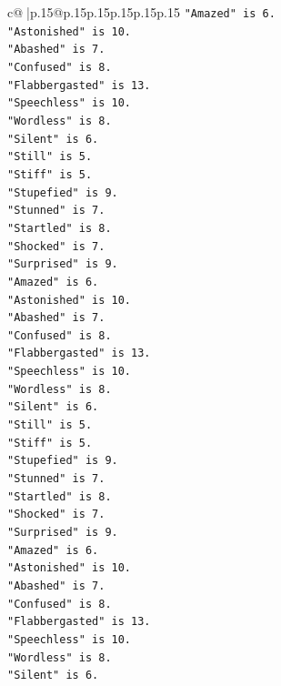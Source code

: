 \documentclass{article}
\begin{document}
{\begin{supertabular}{c@{$\;$}|p{.15\linewidth}@{}p{.15\linewidth}p{.15\linewidth}p{.15\linewidth}p{.15\linewidth}p{.15\linewidth}}
{{{\texttt{"Amazed" is 6.} \\
\texttt{"Astonished" is 10.} \\
\texttt{"Abashed" is 7.} \\
\texttt{"Confused" is 8.} \\
\texttt{"Flabbergasted" is 13.} \\
\texttt{"Speechless" is 10.} \\
\texttt{"Wordless" is 8.} \\
\texttt{"Silent" is 6.} \\
\texttt{"Still" is 5.} \\
\texttt{"Stiff" is 5.} \\
\texttt{"Stupefied" is 9.} \\
\texttt{"Stunned" is 7.} \\
\texttt{"Startled" is 8.} \\
\texttt{"Shocked" is 7.} \\
\texttt{"Surprised" is 9.} \\
\texttt{"Amazed" is 6.} \\
\texttt{"Astonished" is 10.} \\
\texttt{"Abashed" is 7.} \\
\texttt{"Confused" is 8.} \\
\texttt{"Flabbergasted" is 13.} \\
\texttt{"Speechless" is 10.} \\
\texttt{"Wordless" is 8.} \\
\texttt{"Silent" is 6.} \\
\texttt{"Still" is 5.} \\
\texttt{"Stiff" is 5.} \\
\texttt{"Stupefied" is 9.} \\
\texttt{"Stunned" is 7.} \\
\texttt{"Startled" is 8.} \\
\texttt{"Shocked" is 7.} \\
\texttt{"Surprised" is 9.} \\
\texttt{"Amazed" is 6.} \\
\texttt{"Astonished" is 10.} \\
\texttt{"Abashed" is 7.} \\
\texttt{"Confused" is 8.} \\
\texttt{"Flabbergasted" is 13.} \\
\texttt{"Speechless" is 10.} \\
\texttt{"Wordless" is 8.} \\
\texttt{"Silent" is 6.} \\
}}}
\end{supertabular}}
\end{document}
